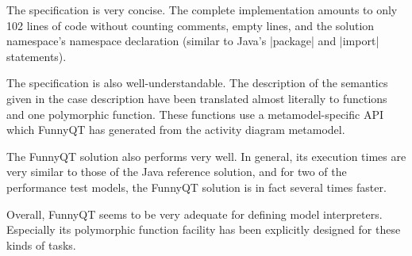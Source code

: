 \documentclass[submission]{eptcs}
\newcommand{\code}{\clojureinline}
\begin{document}
The specification is very concise.  The complete implementation amounts to only
102 lines of code without counting comments, empty lines, and the solution
namespace's namespace declaration (similar to Java's \code|package| and
\code|import| statements).

The specification is also well-understandable.  The description of the
semantics given in the case description have been translated almost literally
to functions and one polymorphic function.  These functions use a
metamodel-specific API which FunnyQT has generated from the activity diagram
metamodel.

The FunnyQT solution also performs very well.  In general, its execution times
are very similar to those of the Java reference solution, and for two of the
performance test models, the FunnyQT solution is in fact several times faster.

Overall, FunnyQT seems to be very adequate for defining model interpreters.
Especially its polymorphic function facility has been explicitly designed for
these kinds of tasks.



\end{document}
